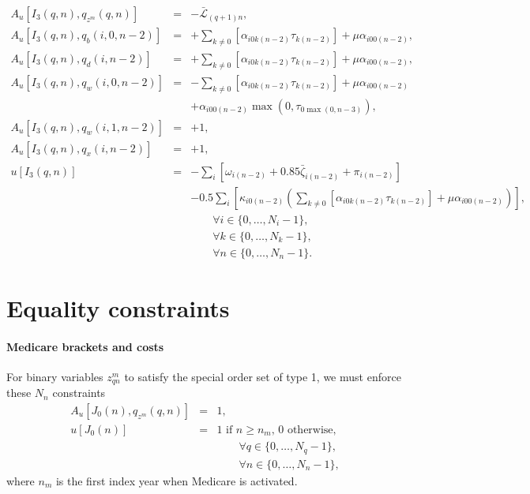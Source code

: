 \documentclass{report}[fleqn,11pt]
\begin{document}
\begin{eqnarray}
	A_u[I_3(q, n), q_{z^m}(q, n)] &=& -\bar{\mathcal{L}}_{(q+1)n}, \nonumber \\
	A_u[I_3(q, n), q_{b}(i, 0, n-2)] &=&
	    + \sum_{k\neq 0} [\alpha_{i0k(n-2)}\tau_{k(n-2)}] + \mu \alpha_{i00(n-2)}, \nonumber \\
	A_u[I_3(q, n), q_{d}(i, n-2)] &=&
	    + \sum_{k\neq 0} [\alpha_{i0k(n-2)}\tau_{k(n-2)}] + \mu \alpha_{i00(n-2)}, \nonumber \\
	A_u[I_3(q, n), q_{w}(i, 0, n-2)] &=& - \sum_{k\neq 0} [\alpha_{i0k(n-2)}\tau_{k(n-2)}] + \mu \alpha_{i00(n-2)} \nonumber \\
	 && +\alpha_{i00(n-2)}\max(0, \tau_{0\max(0, n-3)}), \nonumber \\
	A_u[I_3(q, n), q_{w}(i, 1, n-2)] &=& +1, \nonumber \\
	A_u[I_3(q, n), q_{x}(i, n-2)] &=& +1, \nonumber \\
	u[I_3(q, n)] &=& -\sum_i \left[\omega_{i(n-2)} + 0.85\bar{\zeta}_{i(n-2)} + \pi_{i(n-2)} \right]\nonumber \\
	&& - 0.5 \sum_i \left[\kappa_{i0(n-2)}  \left(
	  \sum_{k\neq 0} [\alpha_{i0k(n-2)}\tau_{k(n-2)}] + \mu\alpha_{i00(n-2)}\right)\right],\nonumber\\
	&&\qquad\forall i \in \{0,\ldots, N_i - 1\}, \nonumber\\
	&&\qquad\forall k \in \{0,\ldots, N_k - 1\}, \nonumber\\
	&&\qquad\forall n \in \{0,\ldots, N_n - 1\}.
\end{eqnarray}

\section{Equality constraints}

\paragraph*{Medicare brackets and costs}
For binary variables $z_{qn}^m$ to satisfy
the special order set of type 1, we must enforce these $N_n$ constraints
\begin{eqnarray}
	A_u[J_0(n), q_{z^m}(q, n)] &=& 1, \nonumber \\
	u[J_0(n)] &=& \text{1 if $n \ge n_m$, 0 otherwise},\\
	&&\qquad\forall q \in \{0,\ldots, N_q - 1\}, \nonumber\\
	&&\qquad\forall n \in \{0,\ldots, N_n - 1\},\nonumber
\end{eqnarray}
where $n_m$ is the first index year when Medicare is activated.
\end{document}
